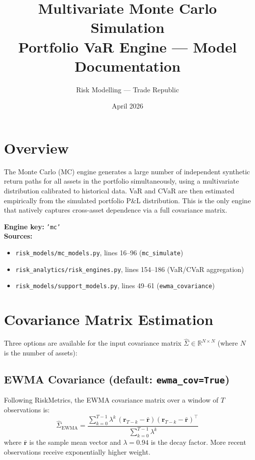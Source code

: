 \documentclass[11pt, a4paper]{article}
\title{\textbf{Multivariate Monte Carlo Simulation}\\[4pt]
\large Portfolio VaR Engine --- Model Documentation}
\author{Risk Modelling --- Trade Republic}
\date{April 2026}
\begin{document}
\maketitle

\section{Overview}

The Monte Carlo (MC) engine generates a large number of independent
synthetic return paths for all assets in the portfolio simultaneously,
using a multivariate distribution calibrated to historical data.
VaR and CVaR are then estimated empirically from the simulated portfolio
P\&L distribution. This is the only engine that natively captures
cross-asset dependence via a full covariance matrix.

\textbf{Engine key:} \texttt{'mc'} \\
\textbf{Sources:}
\begin{itemize}
  \item \texttt{risk\_models/mc\_models.py}, lines 16--96 (\texttt{mc\_simulate})
  \item \texttt{risk\_analytics/risk\_engines.py}, lines 154--186 (VaR/CVaR aggregation)
  \item \texttt{risk\_models/support\_models.py}, lines 49--61 (\texttt{ewma\_covariance})
\end{itemize}

\section{Covariance Matrix Estimation}

Three options are available for the input covariance matrix
$\hat{\Sigma} \in \mathbb{R}^{N \times N}$ (where $N$ is the number of assets):

\subsection{EWMA Covariance (default: \texttt{ewma\_cov=True})}

Following RiskMetrics, the EWMA covariance matrix over a window of $T$
observations is:
\begin{equation}
\hat{\Sigma}_{\text{EWMA}}
= \frac{\sum_{k=0}^{T-1} \lambda^k \, (\mathbf{r}_{T-k} - \bar{\mathbf{r}})
                                      (\mathbf{r}_{T-k} - \bar{\mathbf{r}})^\top}
       {\sum_{k=0}^{T-1} \lambda^k}
\label{eq:ewma_cov}
\end{equation}
where $\bar{\mathbf{r}}$ is the sample mean vector and $\lambda = 0.94$
is the decay factor. More recent observations receive exponentially higher
weight.
\end{document}

